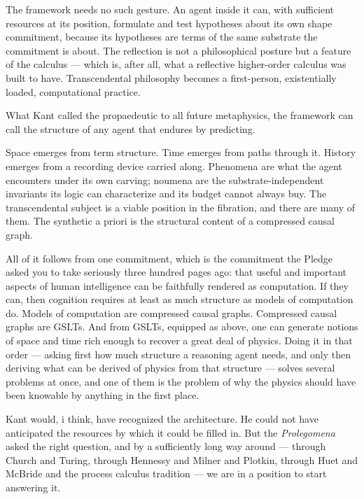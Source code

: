 The framework needs no such gesture.
An agent inside it can, with sufficient resources at its position,
formulate and test hypotheses about its own shape commitment,
because its hypotheses are terms of the same substrate the
commitment is about.
The reflection is not a philosophical posture but a feature of the
calculus --- which is, after all, what a reflective higher-order
calculus was built to have.
Transcendental philosophy becomes a first-person, existentially
loaded, computational practice.

What Kant called the propaedeutic to all future metaphysics, the
framework can call the structure of any agent that endures by
predicting.

Space emerges from term structure.
Time emerges from paths through it.
History emerges from a recording device carried along.
Phenomena are what the agent encounters under its own carving;
noumena are the substrate-independent invariants its logic can
characterize and its budget cannot always buy.
The transcendental subject is a viable position in the fibration,
and there are many of them.
The synthetic a priori is the structural content of a compressed
causal graph.

All of it follows from one commitment, which is the commitment the
Pledge asked you to take seriously three hundred pages ago: that
useful and important aspects of human intelligence can be
faithfully rendered as computation.
If they can, then cognition requires at least as much structure as
models of computation do.
Models of computation are compressed causal graphs.
Compressed causal graphs are GSLTs.
And from GSLTs, equipped as above, one can generate notions of
space and time rich enough to recover a great deal of physics.
Doing it in that order --- asking first how much structure a
reasoning agent needs, and only then deriving what can be derived
of physics from that structure --- solves several problems at once,
and one of them is the problem of why the physics should have been
knowable by anything in the first place.

Kant would, i think, have recognized the architecture.
He could not have anticipated the resources by which it could be
filled in.
But the \emph{Prolegomena} asked the right question, and by a
sufficiently long way around --- through Church and Turing, through
Hennessy and Milner and Plotkin, through Huet and McBride and the
process calculus tradition --- we are in a position to start
answering it.

